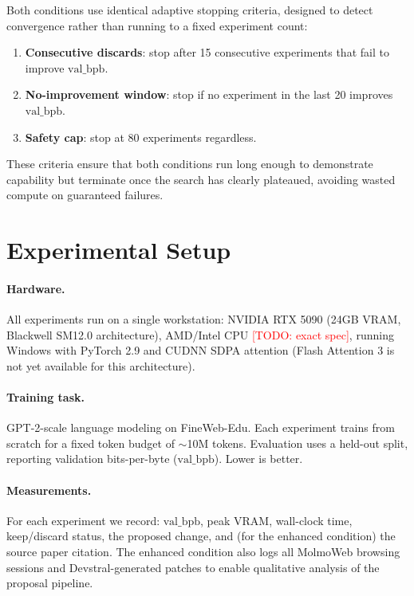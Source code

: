 \documentclass[11pt]{article}
\newcommand{\todo}[1]{\textcolor{red}{[TODO: #1]}}
\newcommand{\val}{\text{val\_bpb}}
\begin{document}
Both conditions use identical adaptive stopping criteria, designed to
detect convergence rather than running to a fixed experiment count:

\begin{enumerate}
  \item \textbf{Consecutive discards}: stop after 15 consecutive
    experiments that fail to improve $\val$.
  \item \textbf{No-improvement window}: stop if no experiment in the
    last 20 improves $\val$.
  \item \textbf{Safety cap}: stop at 80 experiments regardless.
\end{enumerate}

These criteria ensure that both conditions run long enough to
demonstrate capability but terminate once the search has clearly
plateaued, avoiding wasted compute on guaranteed failures.


\section{Experimental Setup}
\label{sec:setup}

\paragraph{Hardware.}
All experiments run on a single workstation: NVIDIA RTX 5090 (24GB
VRAM, Blackwell SM12.0 architecture), AMD/Intel CPU \todo{exact spec},
running Windows with PyTorch 2.9 and CUDNN SDPA attention (Flash
Attention 3 is not yet available for this architecture).

\paragraph{Training task.}
GPT-2-scale language modeling on FineWeb-Edu. Each experiment trains
from scratch for a fixed token budget of $\sim$10M tokens. Evaluation
uses a held-out split, reporting validation bits-per-byte ($\val$).
Lower is better.

\paragraph{Measurements.}
For each experiment we record: $\val$, peak VRAM, wall-clock time,
keep/discard status, the proposed change, and (for the enhanced
condition) the source paper citation. The enhanced condition also logs
all MolmoWeb browsing sessions and Devstral-generated patches to enable
qualitative analysis of the proposal pipeline.
\end{document}
